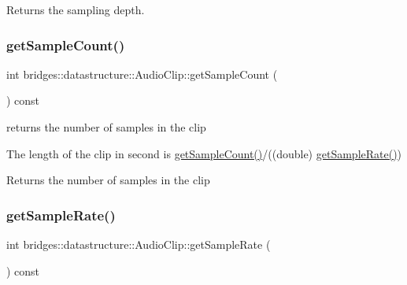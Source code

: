 \begin{DoxyReturn}{Returns}
the sampling depth. 
\end{DoxyReturn}
\mbox{\label{classbridges_1_1datastructure_1_1_audio_clip_aaaee4b34cd512c02a0c0ea072782a9d6}} 
\subsubsection{\texorpdfstring{get\+Sample\+Count()}{getSampleCount()}}
{\footnotesize\ttfamily int bridges\+::datastructure\+::\+Audio\+Clip\+::get\+Sample\+Count (\begin{DoxyParamCaption}{ }\end{DoxyParamCaption}) const\hspace{0.3cm}{\ttfamily [inline]}}



returns the number of samples in the clip 

The length of the clip in second is \hyperlink{classbridges_1_1datastructure_1_1_audio_clip_aaaee4b34cd512c02a0c0ea072782a9d6}{get\+Sample\+Count()}/((double) \hyperlink{classbridges_1_1datastructure_1_1_audio_clip_a520e4a9bbe0685b3598d90668172618c}{get\+Sample\+Rate()})

\begin{DoxyReturn}{Returns}
the number of samples in the clip 
\end{DoxyReturn}
\mbox{\label{classbridges_1_1datastructure_1_1_audio_clip_a520e4a9bbe0685b3598d90668172618c}} 
\subsubsection{\texorpdfstring{get\+Sample\+Rate()}{getSampleRate()}}
{\footnotesize\ttfamily int bridges\+::datastructure\+::\+Audio\+Clip\+::get\+Sample\+Rate (\begin{DoxyParamCaption}{ }\end{DoxyParamCaption}) const\hspace{0.3cm}{\ttfamily [inline]}}



